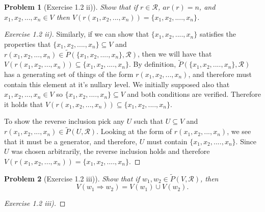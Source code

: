 \documentclass{article}
\theoremstyle{problemstyle}
\newtheorem{problem}{Problem}
\begin{document}
\begin{problem}[Exercise 1.2 ii)] 
Show that if $r \in \mathscr{R}$, $ar(r) = n$, and $x_1,x_2,...,x_n \in V$ then $V(r(x_1,x_2,...,x_n)) = \{x_1,x_2,....,x_n\}$.
\end{problem}

\begin{proof}[Exercise 1.2 ii)]
Similarly, if we can show that $\{x_1,x_2,....,x_n\}$ satisfies the properties that $\{x_1,x_2,....,x_n\} \subseteq V$ and $r(x_1,x_2,...,x_n) \in \widetilde{P}(\{x_1,x_2,....,x_n\},\mathscr{R})$, then we will have that $V(r(x_1,x_2,...,x_n)) \subseteq \{x_1,x_2,....,x_n\}$. By definition, $\widetilde{P}(\{x_1,x_2,....,x_n\},\mathscr{R})$ has a generating set of things of the form $r(x_1,x_2,...,x_n)$, and therefore must contain this element at it's nullary level. We initially supposed also that $x_1,x_2,...,x_n \in V$ so $\{x_1,x_2,....,x_n\} \subseteq V$ and both conditions are verified. Therefore it holds that $V(r(x_1,x_2,...,x_n)) \subseteq \{x_1,x_2,....,x_n\}$. 

To show the reverse inclusion pick any $U$ such that $U \subseteq V$ and $r(x_1,x_2,...,x_n) \in \widetilde{P}(U,\mathscr{R})$. Looking at the form of $r(x_1,x_2,...,x_n)$, we see that it must be a generator, and therefore, $U$ must contain $\{x_1,x_2,....,x_n\}$. Since $U$ was chosen arbitrarily, the reverse inclusion holds and therefore $V(r(x_1,x_2,...,x_n)) = \{x_1,x_2,....,x_n\}$.
\end{proof}

\begin{problem}[Exercise 1.2 iii)] 
Show that if $w_1,w_2 \in \widetilde{P}(V,\mathscr{R})$, then $$V(w_1\Rightarrow w_2) = V(w_1) \cup V(w_2).$$
\end{problem}

\begin{proof}[Exercise 1.2 iii)]
\end{proof}
\end{document}
